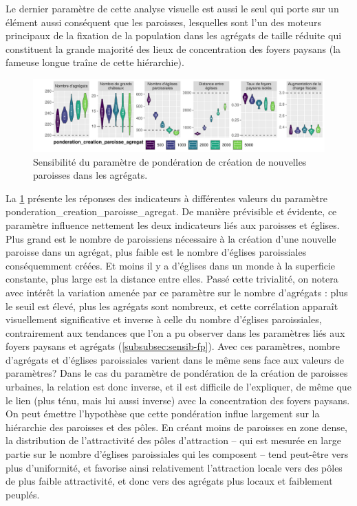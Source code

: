 Le dernier paramètre de cette analyse visuelle est aussi le seul qui porte sur un élément aussi conséquent que les paroisses, lesquelles sont l'un des moteurs principaux de la fixation de la population dans les agrégats de taille réduite qui constituent la grande majorité des lieux de concentration des foyers paysans (la fameuse \og longue traîne\fg{} de cette hiérarchie).

\begin{figure}[H]
	\centering
	\includegraphics[width=\linewidth]{img/sensib/sensibilite_ponderation_creation_paroisse_agregat.pdf}
	\caption{Sensibilité du paramètre de pondération de création de nouvelles paroisses dans les agrégats.}
	\label{fig:sensib-paroisses}
\end{figure}

La \cref{fig:sensib-paroisses} présente les réponses des indicateurs à différentes valeurs du paramètre \textsf{ponderation\_creation\_paroisse\_agregat}.
De manière prévisible et évidente, ce paramètre influence nettement les deux indicateurs liés aux paroisses et églises.
Plus grand est le nombre de paroissiens nécessaire à la création d'une nouvelle paroisse dans un agrégat, plus faible est le nombre d'églises paroissiales conséquemment créées.
Et moins il y a d'églises dans un monde à la superficie constante, plus large est la distance entre elles.
Passé cette trivialité, on notera avec intérêt la variation amenée par ce paramètre sur le nombre d'agrégats : plus le seuil est élevé, plus les agrégats sont nombreux, et cette corrélation apparaît visuellement significative et inverse à celle du nombre d'églises paroissiales, contrairement aux tendances que l'on a pu observer dans les paramètres liés aux foyers paysans et agrégats (\cref{subsubsec:sensib-fp}).
Avec ces paramètres, nombre d'agrégats et d'églises paroissiales varient dans le même sens face aux valeurs de paramètres?
Dans le cas du paramètre de pondération de la création de paroisses \og urbaines\fg{}, la relation est donc inverse, et il est difficile de l'expliquer, de même que le lien (plus ténu, mais lui aussi inverse) avec la concentration des foyers paysans.
On peut émettre l'hypothèse que cette pondération influe largement sur la hiérarchie des paroisses et des pôles.
En créant moins de paroisses en zone dense, la distribution de l'attractivité des pôles d'attraction -- qui est mesurée en large partie sur le nombre d'églises paroissiales qui les composent -- tend peut-être vers plus d'uniformité, et favorise ainsi relativement l'attraction locale vers des pôles de plus faible attractivité, et donc vers des agrégats plus locaux et faiblement peuplés.



